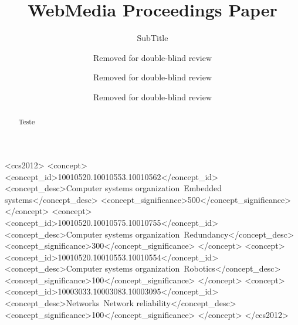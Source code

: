 \documentclass[sigconf]{acmart}
\begin{document}
\title{WebMedia Proceedings Paper}
\subtitle{SubTitle}


\author{Removed for double-blind review}

\author{Removed for double-blind review}

\author{Removed for double-blind review}


\renewcommand{\shortauthors}{Removed for double-blind review}


\begin{abstract}
Teste
\end{abstract}

%
%
\begin{CCSXML}
<ccs2012>
 <concept>
  <concept_id>10010520.10010553.10010562</concept_id>
  <concept_desc>Computer systems organization~Embedded systems</concept_desc>
  <concept_significance>500</concept_significance>
 </concept>
 <concept>
  <concept_id>10010520.10010575.10010755</concept_id>
  <concept_desc>Computer systems organization~Redundancy</concept_desc>
  <concept_significance>300</concept_significance>
 </concept>
 <concept>
  <concept_id>10010520.10010553.10010554</concept_id>
  <concept_desc>Computer systems organization~Robotics</concept_desc>
  <concept_significance>100</concept_significance>
 </concept>
 <concept>
  <concept_id>10003033.10003083.10003095</concept_id>
  <concept_desc>Networks~Network reliability</concept_desc>
  <concept_significance>100</concept_significance>
 </concept>
</ccs2012>  
\end{CCSXML}
\end{document}
